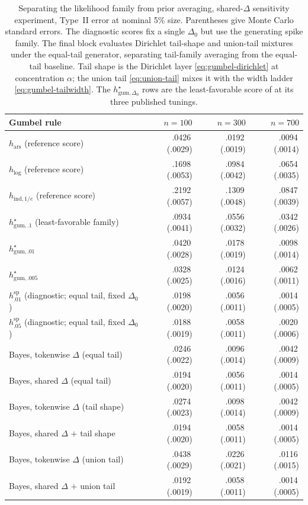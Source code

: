 \documentclass[11pt]{article}
\newcommand{\mcse}[2]{\mbox{#1\,{\fontsize{7}{8}\selectfont(#2)}}}
\begin{document}
\begin{table}[htbp]
\centering
\small
\caption{Separating the likelihood family from prior averaging, shared-$\Delta$ sensitivity experiment, Type~II error at nominal 5\% size.  Parentheses give Monte Carlo standard errors.  The diagnostic scores fix a single $\Delta_0$ but use the generating spike family.  The final block evaluates Dirichlet tail-shape and union-tail mixtures under the equal-tail generator, separating tail-family averaging from the equal-tail baseline.  Tail shape is the Dirichlet layer \eqref{eq:gumbel-dirichlet} at concentration $\alpha$; the union tail \eqref{eq:union-tail} mixes it with the width ladder \eqref{eq:gumbel-tailwidth}.  The $h^\star_{\mathrm{gum},\Delta_0}$ rows are the least-favorable score of \citet{li2025framework} at its three published tunings.}
\label{tab:family}
\begin{tabular}{@{}lrrr@{}}
\toprule
Gumbel rule & $n=100$ & $n=300$ & $n=700$ \\
\midrule
$h_{\mathrm{ars}}$ (reference score) & \mcse{.0426}{.0029} & \mcse{.0192}{.0019} & \mcse{.0094}{.0014} \\
$h_{\log}$ (reference score) & \mcse{.1698}{.0053} & \mcse{.0984}{.0042} & \mcse{.0654}{.0035} \\
$h_{\mathrm{ind},1/e}$ (reference score) & \mcse{.2192}{.0057} & \mcse{.1309}{.0048} & \mcse{.0847}{.0039} \\
\addlinespace
$h^\star_{\mathrm{gum},.1}$ (least-favorable family) & \mcse{.0934}{.0041} & \mcse{.0556}{.0032} & \mcse{.0342}{.0026} \\
$h^\star_{\mathrm{gum},.01}$ & \mcse{.0420}{.0028} & \mcse{.0178}{.0019} & \mcse{.0098}{.0014} \\
$h^\star_{\mathrm{gum},.005}$ & \mcse{.0328}{.0025} & \mcse{.0124}{.0016} & \mcse{.0062}{.0011} \\
\addlinespace
$h^{\mathrm{sp}}_{.01}$ (diagnostic; equal tail, fixed $\Delta_0$) & \mcse{.0198}{.0020} & \mcse{.0056}{.0011} & \mcse{.0014}{.0005} \\
$h^{\mathrm{sp}}_{.05}$ (diagnostic; equal tail, fixed $\Delta_0$) & \mcse{.0188}{.0019} & \mcse{.0058}{.0011} & \mcse{.0020}{.0006} \\
\addlinespace
Bayes, tokenwise $\Delta$ (equal tail) & \mcse{.0246}{.0022} & \mcse{.0096}{.0014} & \mcse{.0042}{.0009} \\
Bayes, shared $\Delta$ (equal tail) & \mcse{.0194}{.0020} & \mcse{.0056}{.0011} & \mcse{.0014}{.0005} \\
\addlinespace
Bayes, tokenwise $\Delta$ (tail shape) & \mcse{.0274}{.0023} & \mcse{.0098}{.0014} & \mcse{.0042}{.0009} \\
Bayes, shared $\Delta$ $+$ tail shape & \mcse{.0194}{.0020} & \mcse{.0058}{.0011} & \mcse{.0014}{.0005} \\
Bayes, tokenwise $\Delta$ (union tail) & \mcse{.0438}{.0029} & \mcse{.0226}{.0021} & \mcse{.0116}{.0015} \\
Bayes, shared $\Delta$ $+$ union tail & \mcse{.0192}{.0019} & \mcse{.0058}{.0011} & \mcse{.0014}{.0005} \\
\bottomrule
\end{tabular}
\end{table}
\end{document}
